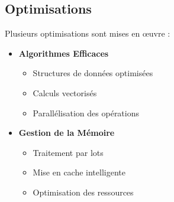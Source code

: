 \subsection{Optimisations}
Plusieurs optimisations sont mises en œuvre :

\begin{itemize}
    \item \textbf{Algorithmes Efficaces}
    \begin{itemize}
        \item Structures de données optimisées
        \item Calculs vectorisés
        \item Parallélisation des opérations
    \end{itemize}

    \item \textbf{Gestion de la Mémoire}
    \begin{itemize}
        \item Traitement par lots
        \item Mise en cache intelligente
        \item Optimisation des ressources
    \end{itemize}
\end{itemize}